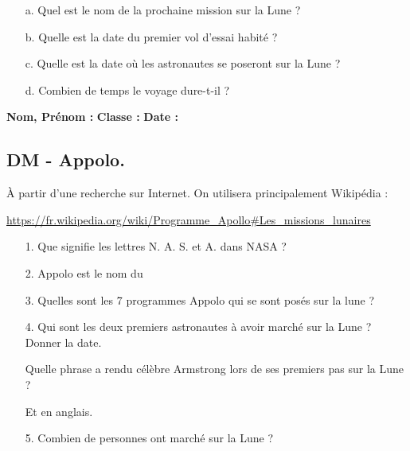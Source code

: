 \begin{enumerate}
  \item[a.] Quel est le nom de la prochaine mission sur la Lune ? \dotfill
  \item[b.] Quelle est la date du premier vol d'essai habité ? \dotfill
  \item[c.] Quelle est la date où les astronautes se poseront sur la Lune ? \dotfill
  \item[d.] Combien de temps le voyage dure-t-il ? \dotfill
\end{enumerate}

\newpage
\textbf{Nom, Prénom :} \hspace{8cm} \textbf{Classe :} \hspace{3cm} \textbf{Date :}\\

\subsection*{DM - Appolo.}

À partir d'une recherche sur Internet. On utilisera principalement Wikipédia :

\url{https://fr.wikipedia.org/wiki/Programme_Apollo#Les_missions_lunaires}


\begin{enumerate}
  \item[1.]Que signifie les lettres N. A. S. et A. dans NASA ? \\
  \Pointilles[2]

  \item[2.]Appolo est le nom du \dotfill
  
  \item[3.]Quelles sont les 7 programmes Appolo qui se sont posés sur la lune ? \\
  \Pointilles[4]

  \item[4.]Qui sont les deux premiers astronautes à avoir marché sur la Lune ? Donner la date.\\
  \Pointilles[1]

  Quelle phrase a rendu célèbre Armstrong lors de ses premiers pas sur la Lune ? \\
  \Pointilles[2]

  Et en anglais. \\
  \Pointilles[2]

  \item[5.]Combien de personnes ont marché sur la Lune ? \\
  \Pointilles[3]
\end{enumerate}

